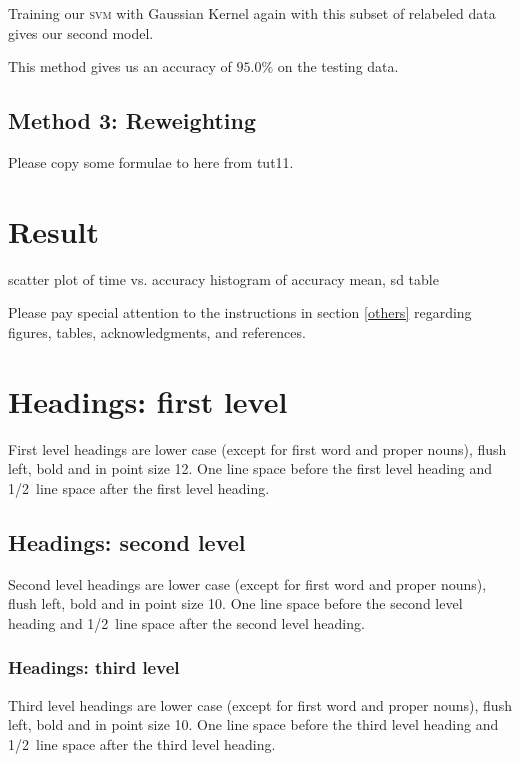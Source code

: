 \documentclass{article} %
\begin{document}
Training our \textsc{svm} with Gaussian Kernel again with this subset of relabeled data gives our second model.

This method gives us an accuracy of $95.0\%$ on the testing data.
\subsection{Method 3: Reweighting}
Please copy some formulae to here from tut11.

\section{Result}
\label{gen_inst}
scatter plot of time vs. accuracy
histogram of accuracy
mean, sd table

Please pay special attention to the instructions in section \ref{others}
regarding figures, tables, acknowledgments, and references.

\section{Headings: first level}
\label{headings}

First level headings are lower case (except for first word and proper nouns),
flush left, bold and in point size 12. One line space before the first level
heading and 1/2~line space after the first level heading.

\subsection{Headings: second level}

Second level headings are lower case (except for first word and proper nouns),
flush left, bold and in point size 10. One line space before the second level
heading and 1/2~line space after the second level heading.

\subsubsection{Headings: third level}

Third level headings are lower case (except for first word and proper nouns),
flush left, bold and in point size 10. One line space before the third level
heading and 1/2~line space after the third level heading.
\end{document}

